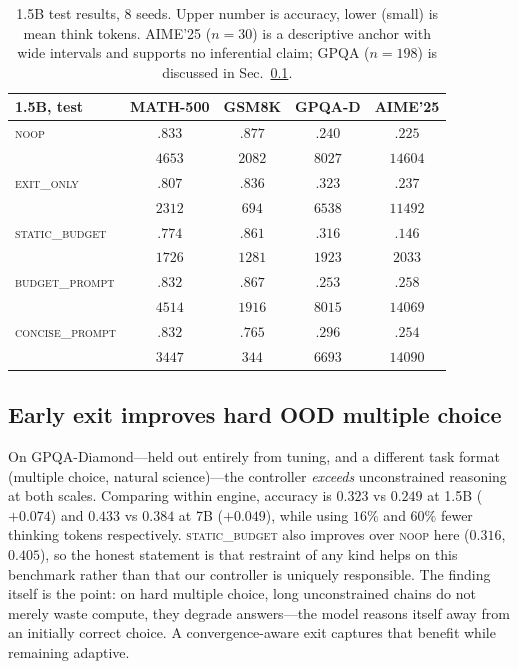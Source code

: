 \begin{table}[t]
\centering
\small
\setlength{\tabcolsep}{4pt}
\begin{tabular}{lcccc}
\toprule
1.5B, test & MATH-500 & GSM8K & GPQA-D & AIME'25 \\
\midrule
\textsc{noop} & $.833$ & $.877$ & $.240$ & $.225$ \\
 & \tiny$4653$ & \tiny$2082$ & \tiny$8027$ & \tiny$14604$ \\
\textsc{exit\_only} & $.807$ & $.836$ & $\mathbf{.323}$ & $.237$ \\
 & \tiny$2312$ & \tiny$694$ & \tiny$6538$ & \tiny$11492$ \\
\textsc{static\_budget} & $.774$ & $.861$ & $.316$ & $.146$ \\
 & \tiny$1726$ & \tiny$1281$ & \tiny$1923$ & \tiny$2033$ \\
\textsc{budget\_prompt} & $.832$ & $.867$ & $.253$ & $.258$ \\
 & \tiny$4514$ & \tiny$1916$ & \tiny$8015$ & \tiny$14069$ \\
\textsc{concise\_prompt} & $.832$ & $.765$ & $.296$ & $.254$ \\
 & \tiny$3447$ & \tiny$344$ & \tiny$6693$ & \tiny$14090$ \\
\bottomrule
\end{tabular}
\caption{1.5B test results, 8 seeds. Upper number is accuracy, lower (small)
is mean think tokens. AIME'25 ($n{=}30$) is a descriptive anchor with wide
intervals and supports no inferential claim; GPQA ($n{=}198$) is discussed in
Sec.~\ref{sec:gpqa}.}
\label{tab:perds}
\end{table}

\subsection{Early exit improves hard OOD multiple choice}
\label{sec:gpqa}

On GPQA-Diamond---held out entirely from tuning, and a different task format
(multiple choice, natural science)---the controller \emph{exceeds}
unconstrained reasoning at both scales. Comparing within engine, accuracy is
$0.323$ vs $0.249$ at 1.5B ($+0.074$) and $0.433$ vs $0.384$ at 7B ($+0.049$),
while using $16\%$ and $60\%$ fewer thinking tokens respectively. \textsc{static\_budget} also improves over
\textsc{noop} here ($0.316$, $0.405$), so the honest statement is that
restraint of any kind helps on this benchmark rather than that our controller
is uniquely responsible. The finding itself is the point: on hard multiple
choice, long unconstrained chains do not merely waste compute, they degrade
answers---the model reasons itself away from an initially correct choice. A
convergence-aware exit captures that benefit while remaining adaptive.

